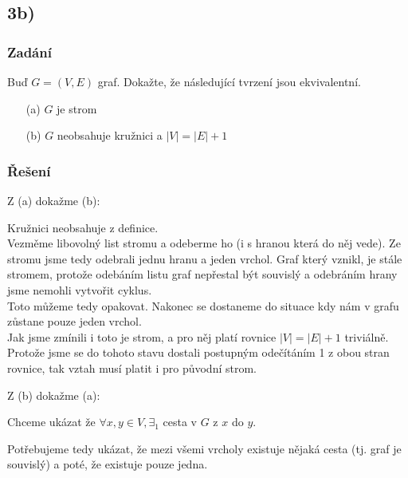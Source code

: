 \documentclass[../main.tex]{subfiles}
\begin{document}
\subsection{3b)}
\subsubsection*{Zadání}
Buď $G=(V,E)$ graf. Dokažte, že následující tvrzení jsou ekvivalentní.
\begin{enumerate}
    \item[(a)] $G$ je strom
    \item[(b)] $G$ neobsahuje kružnici a $|V| = |E| + 1$
\end{enumerate}

\subsubsection*{Řešení}

Z (a) dokažme (b):

Kružnici neobsahuje z definice.\\
Vezměme libovolný list stromu a odeberme ho (i s hranou která do něj vede).
Ze stromu jsme tedy odebrali jednu hranu a jeden vrchol. Graf který vznikl,
je stále stromem, protože odebáním listu graf nepřestal být souvislý a odebráním hrany jsme nemohli vytvořit cyklus.\\
Toto můžeme tedy opakovat. Nakonec se dostaneme do situace kdy nám v grafu zůstane pouze jeden vrchol.\\
Jak jsme zmínili i toto je strom, a pro něj platí rovnice $|V|=|E|+1$ triviálně.
Protože jsme se do tohoto stavu dostali postupným odečítáním 1 z obou stran rovnice, tak vztah musí platit i pro původní strom.


Z (b) dokažme (a):

Chceme ukázat že $\forall x,y \in V, \exists_1$ cesta v $G$ z $x$ do $y$. 

Potřebujeme tedy ukázat, že mezi všemi vrcholy existuje nějaká cesta (tj. graf je souvislý) a poté, že existuje pouze jedna.
\end{document}
